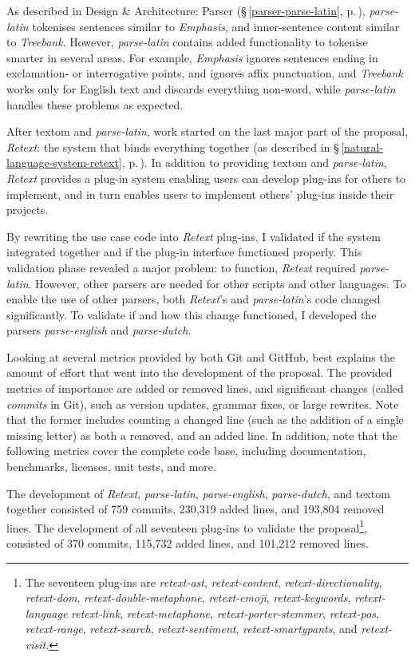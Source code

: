 As described in Design \& Architecture: Parser (§\,\ref{parser-parse-latin},
  p.\,\pageref{parser-parse-latin}), \emph{parse-latin} tokenises sentences
  similar to \emph{Emphasis}, and inner-sentence content similar to
  \emph{Treebank}.
However, \emph{parse-latin} contains added functionality to tokenise smarter
  in several areas.
For example, \emph{Emphasis} ignores sentences ending in exclamation- or
  interrogative points, and ignores affix punctuation, and \emph{Treebank}
  works only for English text and discards everything non-word, while
  \emph{parse-latin} handles these problems as expected.

After \gls{textom} and \emph{parse-latin}, work started on the last major
  part of the proposal, \emph{Retext}: the system that binds everything
  together (as described in §\,\ref{natural-language-system-retext},
  p.\,\pageref{natural-language-system-retext}).
In addition to providing \gls{textom} and \emph{parse-latin}, \emph{Retext}
  provides a plug-in system enabling users can develop plug-ins for others
  to implement, and in turn enables users to implement others' plug-ins
  inside their projects.

By rewriting the use case code into \emph{Retext} plug-ins, I validated if
  the system integrated together and if the plug-in interface functioned
  properly.
This validation phase revealed a major problem: to function, \emph{Retext}
  required \emph{parse-latin}.
However, other parsers are needed for other scripts and other languages.
To enable the use of other parsers, both \emph{Retext}'s and
  \emph{parse-latin}'s code changed significantly.
To validate if and how this change functioned, I developed the parsers
  \emph{parse-english} and \emph{parse-dutch}.

Looking at several metrics provided by both Git and GitHub, best explains
  the amount of effort that went into the development of the proposal.
The provided metrics of importance are added or removed lines, and
  significant changes (called \emph{commits} in Git), such as version
  updates, grammar fixes, or large rewrites.
Note that the former includes counting a changed line (such as the
  addition of a single missing letter) as both a removed, and an added line.
In addition, note that the following metrics cover the complete code base,
  including documentation, benchmarks, licenses, unit tests, and more.

The development of \emph{Retext}, \emph{parse-latin}, \emph{parse-english},
  \emph{parse-dutch}, and \gls{textom} together consisted of 759 commits,
  230,319 added lines, and 193,804 removed lines.
The development of all seventeen plug-ins to validate the
  proposal\footnote{The seventeen plug-ins are \emph{retext-ast},
    \emph{retext-content},
    \emph{retext-directionality}, \emph{retext-dom},
    \emph{retext-double-metaphone}, \emph{retext-emoji},
    \emph{retext-keywords}, \emph{retext-language}
    \emph{retext-link}, \emph{retext-metaphone},
    \emph{retext-porter-stemmer}, \emph{retext-pos}, \emph{retext-range},
    \emph{retext-search}, \emph{retext-sentiment}, \emph{retext-smartypants},
    and \emph{retext-visit}.},
  consisted of 370 commits, 115,732 added lines, and 101,212 removed lines.


